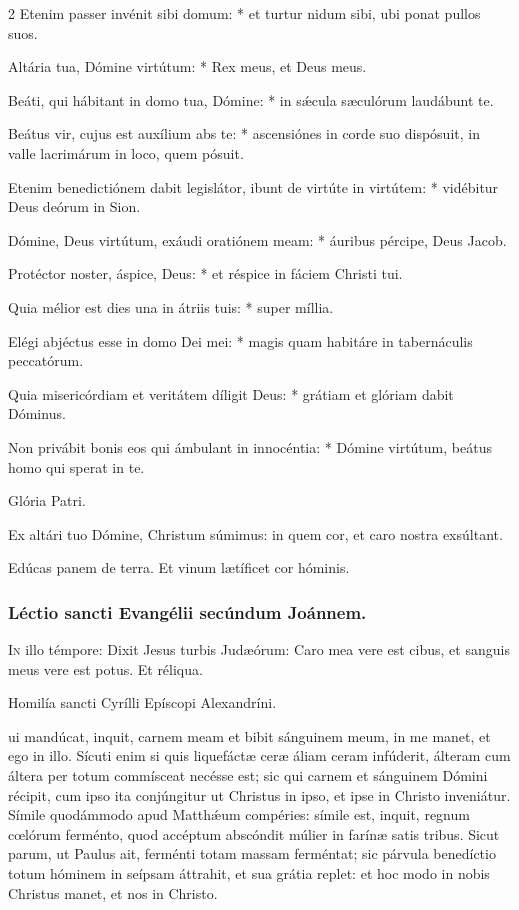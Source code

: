 \documentclass[9pt,twoside]{extarticle}
\begin{document}
\begin{multicols}{2}
Etenim passer invénit sibi domum: * et turtur nidum sibi, ubi ponat pullos suos.

Altária tua, Dómine virtútum: * Rex meus, et Deus meus.

Beáti, qui hábitant in domo tua, Dómine: * in sǽcula sæculórum laudábunt te.

Beátus vir, cujus est auxílium abs te: * ascensiónes in corde suo dispósuit, in valle lacrimárum in loco, quem pósuit.

Etenim benedictiónem dabit legislátor, ibunt de virtúte in virtútem: * vidébitur Deus deórum in Sion.

Dómine, Deus virtútum, exáudi oratiónem meam: * áuribus pércipe, Deus Jacob.

Protéctor noster, áspice, Deus: * et réspice in fáciem Christi tui.

Quia mélior est dies una in átriis tuis: * super míllia.

Elégi abjéctus esse in domo Dei mei: * magis quam habitáre in tabernáculis peccatórum.

Quia misericórdiam et veritátem díligit Deus: * grátiam et glóriam dabit Dóminus.

Non privábit bonis eos qui ámbulant in innocéntia: * Dómine virtútum, beátus homo qui sperat in te.

Glória Patri.

\begin{tightlist}{}
\item {} Ex altári tuo Dómine, Christum súmimus: in quem cor, et caro nostra exsúltant.
\item {} Edúcas panem de terra.  Et vinum lætíficet cor hóminis.
\end{tightlist}

\subsubsection*{\center Léctio sancti Evangélii secúndum Joánnem.}
\begin{center}  \end{center}
\lettrine{I}n illo témpore: Dixit Jesus turbis Judæórum: Caro mea vere est cibus, et sanguis meus vere est potus. Et réliqua.

\begin{center}Homilía sancti Cyrílli Epíscopi Alexandríni.\\
 \end{center}
ui mandúcat, inquit, carnem meam et bibit sánguinem meum, in me manet, et ego in illo. Sícuti enim si quis liquefáctæ ceræ áliam ceram infúderit, álteram cum áltera per totum commísceat necésse est; sic qui carnem et sánguinem Dómini récipit, cum ipso ita conjúngitur ut Christus in ipso, et ipse in Christo inveniátur. Símile quodámmodo apud Matthǽum compéries: símile est, inquit, regnum cœlórum ferménto, quod accéptum abscóndit múlier in farínæ satis tribus. Sicut parum, ut Paulus ait, ferménti totam massam ferméntat; sic párvula benedíctio totum hóminem in seípsam áttrahit, et sua grátia replet: et hoc modo in nobis Christus manet, et nos in Christo.


\end{multicols}
\end{document}
